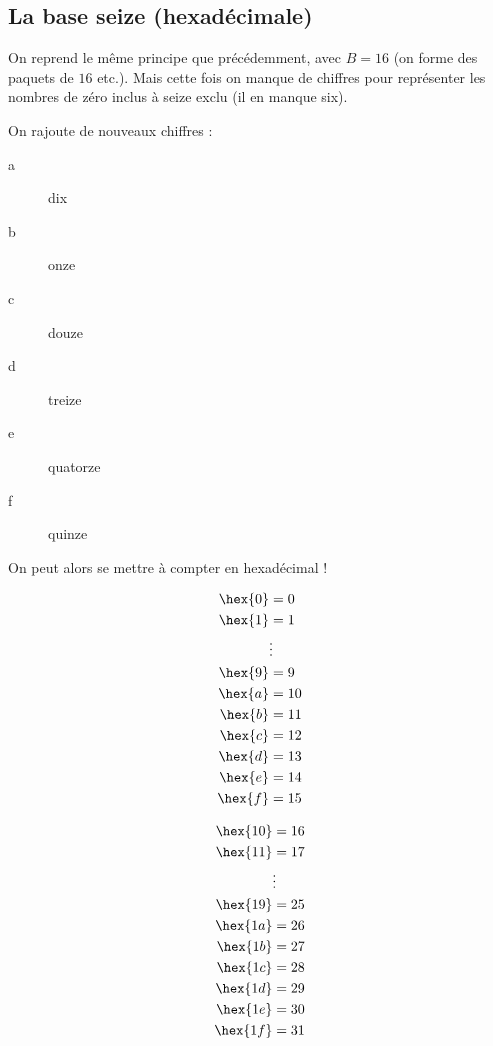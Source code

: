 \subsection{La base seize (hexadécimale)}

On reprend le même principe que précédemment, avec $B = 16$ (on forme des paquets de $16$ etc.). Mais cette fois on manque de chiffres pour représenter les nombres de zéro inclus à
seize exclu (il en manque six).

On rajoute de nouveaux \og chiffres \fg{}:
\begin{description}
\item[a] dix
\item[b] onze
\item[c] douze
\item[d] treize
\item[e] quatorze
\item[f] quinze
\end{description}
On peut alors se mettre à compter en hexadécimal !
\vskip-1pt
\noindent\begin{minipage}[t]{0.18\linewidth}
\footnotesize{}
\begin{align*}
\hex{0} &= 0\\
\hex{1} &= 1\\
&\vdots\\
\hex{9} &= 9\\
\hex{a} &= 10\\
\hex{b} &= 11\\
\hex{c} &= 12\\
\hex{d} &= 13\\
\hex{e} &= 14\\
\hex{f} &= 15\\
\end{align*}
\end{minipage}
\begin{minipage}[t]{0.18\linewidth}
\footnotesize{}
\begin{align*}
\hex{10} &= 16\\
\hex{11} &= 17\\
&\vdots\\
\hex{19} &= 25\\
\hex{1a} &= 26\\
\hex{1b} &= 27\\
\hex{1c} &= 28\\
\hex{1d} &= 29\\
\hex{1e} &= 30\\
\hex{1f} &= 31\\
\end{align*}
\end{minipage}
